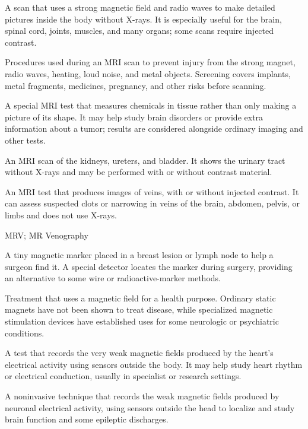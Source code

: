  A scan that uses a strong magnetic field and radio waves to make detailed pictures inside the body without X-rays. It is especially useful for the brain, spinal cord, joints, muscles, and many organs; some scans require injected contrast.

 Procedures used during an MRI scan to prevent injury from the strong magnet, radio waves, heating, loud noise, and metal objects. Screening covers implants, metal fragments, medicines, pregnancy, and other risks before scanning.

 A special MRI test that measures chemicals in tissue rather than only making a picture of its shape. It may help study brain disorders or provide extra information about a tumor; results are considered alongside ordinary imaging and other tests.

 An MRI scan of the kidneys, ureters, and bladder. It shows the urinary tract without X-rays and may be performed with or without contrast material.

 An MRI test that produces images of veins, with or without injected contrast. It can assess suspected clots or narrowing in veins of the brain, abdomen, pelvis, or limbs and does not use X-rays.

\synonyms
MRV; MR Venography

 A tiny magnetic marker placed in a breast lesion or lymph node to help a surgeon find it. A special detector locates the marker during surgery, providing an alternative to some wire or radioactive-marker methods.

 Treatment that uses a magnetic field for a health purpose. Ordinary static magnets have not been shown to treat disease, while specialized magnetic stimulation devices have established uses for some neurologic or psychiatric conditions.

 A test that records the very weak magnetic fields produced by the heart’s electrical activity using sensors outside the body. It may help study heart rhythm or electrical conduction, usually in specialist or research settings.

 A noninvasive technique that records the weak magnetic fields produced by neuronal electrical activity, using sensors outside the head to localize and study brain function and some epileptic discharges.

